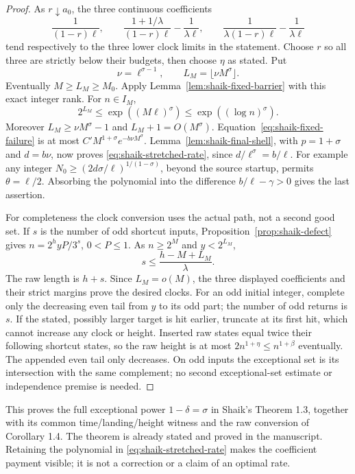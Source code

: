 \documentclass[11pt]{article}
\theoremstyle{remark}\newtheorem{remark}[proposition]{Remark}
\begin{document}
\begin{proof}
As \(r\downarrow a_0\), the three continuous coefficients
\[
 \frac1{(1-r)\ell},\qquad
 \frac{1+1/\lambda}{(1-r)\ell}-\frac1{\lambda\ell},\qquad
 \frac1{\lambda(1-r)\ell}-\frac1{\lambda\ell}
\]
tend respectively to the three lower clock limits in the statement.
Choose \(r\) so all three are strictly below their budgets, then
choose \(\eta\) as stated. Put
\[
 \nu=\ell^{\sigma-1},\qquad L_M=\lfloor\nu M^\sigma\rfloor.
\]
Eventually \(M\ge L_M\ge M_0\). Apply
Lemma~\ref{lem:shaik-fixed-barrier} with this exact integer rank.
For \(n\in I_M\),
\[
 2^{L_M}\le\exp((M\ell)^\sigma)\le\exp((\log n)^\sigma).
\]
Moreover \(L_M\ge\nu M^\sigma-1\) and \(L_M+1=O(M^\sigma)\).
Equation~\eqref{eq:shaik-fixed-failure} is at most
\(C'M^{1+\sigma}e^{-b\nu M^\sigma}\).
Lemma~\ref{lem:shaik-final-shell}, with
\(p=1+\sigma\) and \(d=b\nu\), now proves
\eqref{eq:shaik-stretched-rate}, since \(d/\ell^\sigma=b/\ell\).
For example any integer
\(N_0\ge(2d\sigma/\ell)^{1/(1-\sigma)}\), beyond the source startup,
permits \(\theta=\ell/2\).
Absorbing the polynomial into the difference \(b/\ell-\gamma>0\)
gives the last assertion.

For completeness the clock conversion uses the actual path, not a
second good set. If \(s\) is the number of odd shortcut inputs,
Proposition~\ref{prop:shaik-defect} gives
\(n=2^hyP/3^s\), \(0<P\le1\).
As \(n\ge2^M\) and \(y<2^{L_M}\),
\begin{equation}\label{eq:shaik-fixed-odd-budget}
 s\le\frac{h-M+L_M}{\lambda}.
\end{equation}
The raw length is \(h+s\). Since \(L_M=o(M)\), the three displayed
coefficients and their strict margins prove the desired clocks.
For an odd initial integer, complete only the decreasing even tail
from \(y\) to its odd part; the number of odd returns is \(s\).
If the stated, possibly larger target is hit earlier, truncate at its
first hit, which cannot increase any clock or height.
Inserted raw states equal twice their following shortcut states, so
the raw height is at most \(2n^{1+\eta}\le n^{1+\beta}\) eventually.
The appended even tail only decreases.
On odd inputs the exceptional set is its intersection with the same
complement; no second exceptional-set estimate or independence premise
is needed.
\end{proof}

This proves the full exceptional power \(1-\delta=\sigma\) in
Shaik's Theorem 1.3, together with its common time/landing/height witness
and the raw conversion of Corollary 1.4. The theorem is already stated
and proved in the manuscript. Retaining the polynomial in
\eqref{eq:shaik-stretched-rate} makes the coefficient payment visible;
it is not a correction or a claim of an optimal rate.
\end{document}
